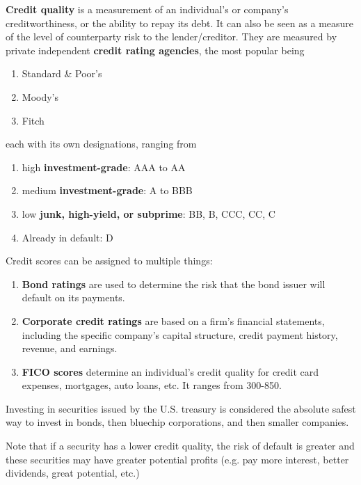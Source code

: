 \documentclass{article}
\begin{document}
    \begin{definition}
      \label{def:credit-quality}
      \textbf{Credit quality} is a measurement of an individual's or company's creditworthiness, or the ability to repay its debt. It can also be seen as a measure of the level of counterparty risk to the lender/creditor. They are measured by private independent \textbf{credit rating agencies}, the most popular being
      \begin{enumerate}
        \item Standard \& Poor's 
        \item Moody's 
        \item Fitch
      \end{enumerate}
      each with its own designations, ranging from 
      \begin{enumerate}
        \item high \textbf{investment-grade}: AAA to AA
        \item medium \textbf{investment-grade}: A to BBB
        \item low \textbf{junk, high-yield, or subprime}: BB, B, CCC, CC, C
        \item Already in default: D 
      \end{enumerate}
      Credit scores can be assigned to multiple things:
      \begin{enumerate}
        \item \textbf{Bond ratings} are used to determine the risk that the bond issuer will default on its payments. 
        \item \textbf{Corporate credit ratings} are based on a firm's financial statements, including the specific company's capital structure, credit payment history, revenue, and earnings.
        \item \textbf{FICO scores} determine an individual's credit quality for credit card expenses, mortgages, auto loans, etc. It ranges from 300-850. 
      \end{enumerate}
      Investing in securities issued by the U.S. treasury is considered the absolute safest way to invest in bonds, then bluechip corporations, and then smaller companies. 
    \end{definition}

    Note that if a security has a lower credit quality, the risk of default is greater and these securities may have greater potential profits (e.g. pay more interest, better dividends, great potential, etc.) 
\end{document}
